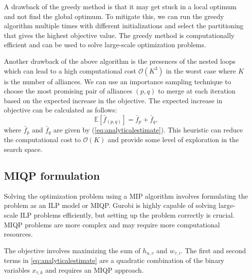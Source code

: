 \documentclass[preprint,times]{elsarticle}
\def\mkhalil#1{{\color{black} #1}}
\begin{document}
A drawback of the greedy method is that it may get stuck in a local optimum and not find the global optimum. To mitigate this, we can run the greedy algorithm multiple times with different initializations and select the partitioning that gives the highest objective value. The greedy method is computationally efficient and can be used to solve large-scale optimization problems.

Another drawback of the above algorithm is the presences of the nested loops which can lead to a high computational cost $\mathcal{{O}}(K^3)$ in the worst case where $K$ is the number of \mkhalil{alliances}. We can use an importance sampling technique to choose the most promising pair of \mkhalil{alliances} $(p,q)$ to merge at each iteration based on the expected increase in the objective. The expected increase in objective can be calculated as follows:
%
\begin{equation} \label{eq:expectedmod}
\mathbb{E}[\bar{f}_{(p,q)}] = \bar{f}_{p} + \bar{f}_{q},
\end{equation}
%
where $\bar{f}_{p}$ and $\bar{f}_{q}$ are given by (\ref{eq:analyticalestimate}). This heuristic can reduce the computational cost to $\mathcal{O}(K)$ and provide some level of exploration in the search space.

\subsection{\Ac{MIQP} formulation} \label{subsec:exact}

Solving the optimization problem using a \ac{MIP} algorithm involves formulating the problem as an \ac{ILP} model or \ac{MIQP}. Gurobi is highly capable of solving large-scale \ac{ILP} problems efficiently, but setting up the problem correctly is crucial. \ac{MIQP} problems are more complex and may require more computational resources.


The objective involves maximizing the sum of $h_{u,v}$ and $w_{\tau,i}$.
%
\mkhalil{The first and second terms in \eqref{eq:analyticalestimate} are a quadratic combination} of the binary variables $x_{\tau, k}$ and requires an \ac{MIQP} approach.

\end{document}
